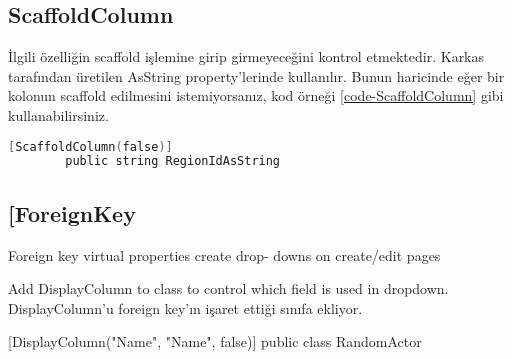 \documentclass[10pt,a4paper]{article}
\begin{document}
\subsection{ScaffoldColumn }
İlgili özelliğin scaffold işlemine girip girmeyeceğini kontrol etmektedir.
Karkas tarafından üretilen AsString property'lerinde kullanılır.
Bunun haricinde eğer bir kolonun scaffold edilmesini istemiyorsanız,
kod örneği \ref{code-ScaffoldColumn} gibi kullanabilirsiniz.




\begin{lstlisting}[label=code-ScaffoldColumn,caption=ScaffoldColumn,language=C]
		[ScaffoldColumn(false)]
		public string RegionIdAsString
\end{lstlisting}


\subsection{[ForeignKey  }


		
Foreign key virtual properties create drop- downs on create/edit pages

Add DisplayColumn to class to control
which field is used in dropdown. DisplayColumn'u foreign key'ın işaret ettiği sınıfa ekliyor.

[DisplayColumn("Name", "Name", false)]
public class RandomActor






% 

\end{document}
